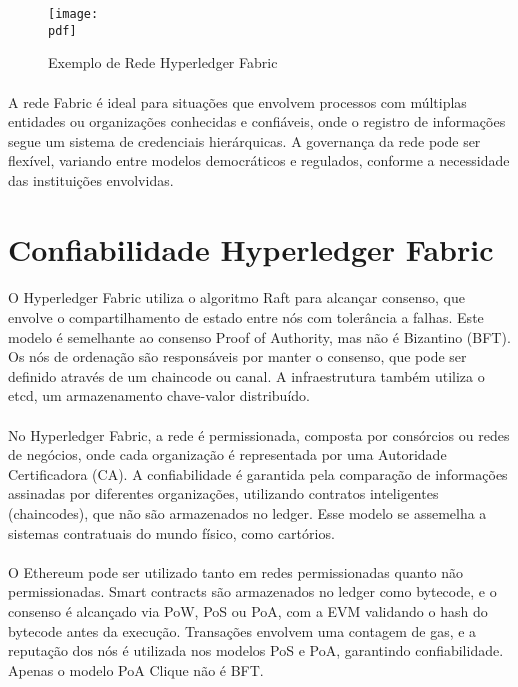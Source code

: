 \documentclass[letterpaper,11pt,leqno]{article}
\newcommand{\pdf}{figures/figures}
\begin{document}
\begin{figure}[H]
	{\texttt{[image: \\pdf]}}
	\caption{Exemplo de Rede Hyperledger Fabric}
	\label{f:figure3}\end{figure}

\paragraph{}
A rede Fabric é ideal para situações que envolvem processos com múltiplas
entidades ou organizações conhecidas e confiáveis, onde o registro de
informações segue um sistema de credenciais hierárquicas. A governança da rede
pode ser flexível, variando entre modelos democráticos e regulados, conforme a
necessidade das instituições envolvidas.

\section{Confiabilidade Hyperledger Fabric}

\paragraph{}
O Hyperledger Fabric utiliza o algoritmo Raft para alcançar consenso, que
envolve o compartilhamento de estado entre nós com tolerância a falhas. Este
modelo é semelhante ao consenso Proof of Authority, mas não é Bizantino (BFT).
Os nós de ordenação são responsáveis por manter o consenso, que pode ser
definido através de um chaincode ou canal. A infraestrutura também utiliza o
etcd, um armazenamento chave-valor distribuído.

\paragraph{}
No Hyperledger Fabric, a rede é permissionada, composta por consórcios ou redes
de negócios, onde cada organização é representada por uma Autoridade
Certificadora (CA). A confiabilidade é garantida pela comparação de informações
assinadas por diferentes organizações, utilizando contratos inteligentes
(chaincodes), que não são armazenados no ledger. Esse modelo se assemelha a
sistemas contratuais do mundo físico, como cartórios.

\newpage{}

\paragraph{}
O Ethereum pode ser utilizado tanto em redes permissionadas quanto não
permissionadas. Smart contracts são armazenados no ledger como bytecode, e o
consenso é alcançado via PoW, PoS ou PoA, com a EVM validando o hash do bytecode
antes da execução. Transações envolvem uma contagem de gas, e a reputação dos
nós é utilizada nos modelos PoS e PoA, garantindo confiabilidade. Apenas o
modelo PoA Clique não é BFT.
\end{document}
